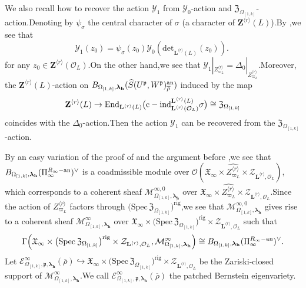 \documentclass[SecEq,CM,GP]{degruyter-crelle} %
\theoremstyle{plain}
\newcommand{\ana}{{\rm an}}
\newcommand{\EndO}{{\rm End}}
\newcommand{\lrr}{{\langle r\rangle}}
\newcommand{\omepik}{\Omega_{[1,k]}}
\newcommand{\rigch}{{\mathcal{Z}_{\bL^{\lrr},\mathcal{O}_L}}}
\newcommand{\sbanpik}{{\big(\mathrm{Spec}\hspace{2pt}\mathfrak{Z}_{\omepik}\big)^{\mathrm{rig}}}}
\newcommand{\zuni}{{\widehat{Z^{\lrr}_{\varpi_L}}}}
\newcommand{\bL}{{\mathbf{L}}}
\newcommand{\bZ}{{\mathbf{Z}}}
\newcommand{\bh}{{\mathbf{h}}}
\newcommand{\cM}{\mathcal M}
\newcommand{\cO}{\mathcal O}
\newcommand{\cY}{\mathcal Y}
\newcommand{\FX}{{\mathfrak{X}}}
\newcommand{\FZ}{{\mathfrak{Z}}}
\newcommand{\fp}{{\mathfrak{p}}}
\begin{document}
We also recall how to recover the action $\cY_1$ from $\cY_0$-action and $\FZ_{\omepik}$-action.\;Denoting by $\psi_{\sigma}$ the central character of $\sigma$ (a character of $\bZ^{\lrr}(L)$).\;By \cite[(3.5)]{Ding2021},\;we see  that \[\cY_1(z_0)=\psi_{\sigma}(z_0)\cY_0(\mathrm{det}_{\bL^{\lrr}(L)}(z_0)).\;\]
for any $z_0\in \bZ^{\lrr}(\cO_L)$.\;On the other hand,\;we see that $\cY_1|_{Z^{\lrr}_{\varpi_L}}=\Delta_0|_{Z^{\lrr}_{\varpi_L}}$.\;Moreover, the $\bZ^{\lrr}(L)$-action on $B_{\omepik,{\bm\lambda}_\bh}(\widehat{S}(U^{\fp},W^{\fp})_{\overline{\rho}}^{\ana})$ induced by the map $$\bZ^{\lrr}(L)\rightarrow  \EndO_{\bL^{\lrr}(L)}\big(\mathrm{c-ind}_{\bL^{\lrr}(\cO_L)}^{\bL^{\lrr}(L)}\sigma\big)\cong\FZ_{\omepik}$$ coincides with the $\Delta_0$-action.\;Then the action $\cY_1$ can be recovered from the $\FZ_{\omepik}$-action.\;

By an easy variation of the proof of \cite[Lemma 3.1.3]{Ding2021} and the argument before \cite[(3.28)]{Ding2021},\;we see that $B_{\omepik,{\bm\lambda}_\bh}(\Pi_\infty^{R_\infty-\ana})^\vee$ is a coadmissible module over $\cO(\FX_{\infty}\times\zuni\times\rigch)$, which corresponds to a coherent sheaf $\cM_{\omepik,{\bm\lambda}_\bh}^{\infty,0}$ over $\FX_{\infty}\times \zuni\times \rigch$.\;Since the action of $Z^{\lrr}_{\varpi_L}$ factors through $\sbanpik$,\;we see that $\cM_{\omepik,{\bm\lambda}_\bh}^{\infty,0}$ gives rise to a coherent sheaf $\cM_{\omepik,{\bm\lambda}_\bh}^{\infty}$ over $\FX_{\infty}\times\sbanpik\times \rigch$ such that
\[\Gamma\Big(\FX_{\infty}\times\sbanpik\times \rigch,\cM_{\omepik,{\bm\lambda}_\bh}^{\infty}\Big)\cong B_{\omepik,{\bm\lambda}_\bh}(\Pi_\infty^{R_\infty-\ana})^\vee.\]
Let $\mathcal{E}_{\omepik,\fp,{\bm\lambda}_\bh}^\infty(\overline{\rho})\hookrightarrow\FX_{\infty}\times\sbanpik\times \rigch$ be the Zariski-closed support of $\cM_{\omepik,{\bm\lambda}_\bh}^{\infty}$.\;We call $\mathcal{E}_{\omepik,\fp,{\bm\lambda}_\bh}^\infty(\overline{\rho})$  the patched Bernstein eigenvariety.\;
\end{document}
